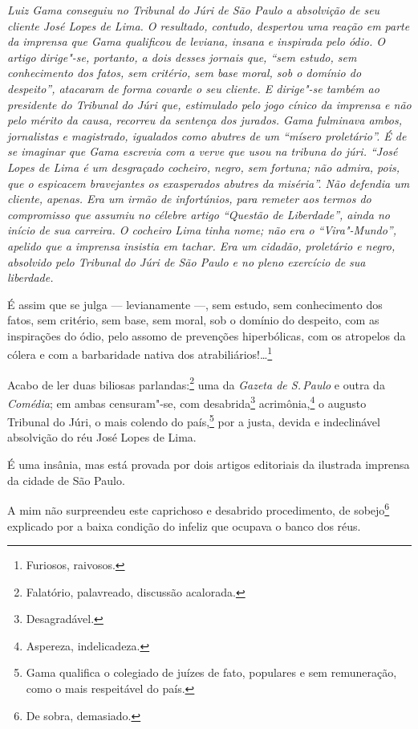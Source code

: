 \begin{flushleft}
{\footnotesize\itshape
Luiz Gama conseguiu no Tribunal
do Júri de São Paulo a absolvição de seu cliente José Lopes de Lima. O
resultado, contudo, despertou uma reação em parte da imprensa que Gama
qualificou de leviana, insana e inspirada pelo ódio. O artigo dirige"-se,
portanto, a dois desses jornais que, ``sem estudo, sem conhecimento dos
fatos, sem critério, sem base moral, sob o domínio do despeito'',
atacaram de forma covarde o seu cliente. E dirige"-se também ao presidente do
Tribunal do Júri que, estimulado pelo jogo cínico da imprensa e não pelo
mérito da causa, recorreu da sentença dos jurados. Gama fulminava ambos,
jornalistas e magistrado, igualados como abutres de um ``mísero
proletário''. É de se imaginar que Gama escrevia com a verve que usou na
tribuna do júri. ``José Lopes de Lima é um desgraçado cocheiro, negro,
sem fortuna; não admira, pois, que o espicacem bravejantes os
exasperados abutres da miséria''. Não defendia um cliente, apenas. Era um
irmão de infortúnios, para remeter aos termos do compromisso que assumiu
no célebre artigo ``Questão de Liberdade'', ainda no início de sua
carreira. O cocheiro Lima tinha nome; não era o ``Vira"-Mundo'', apelido
que a imprensa insistia em tachar. Era um cidadão, proletário e negro,
absolvido pelo Tribunal do Júri de São Paulo e no pleno exercício de sua
liberdade. }
\end{flushleft}

\noindent{}É assim que se julga --- levianamente ---, sem estudo, sem
conhecimento dos fatos, sem critério, sem base, sem moral, sob o domínio
do despeito, com as inspirações do ódio, pelo assomo de prevenções
hiperbólicas, com os atropelos da cólera e com a barbaridade nativa dos
atrabiliários!\ldots{}\footnote{Furiosos, raivosos.}

Acabo de ler duas biliosas parlandas:\footnote{Falatório, palavreado,
  discussão acalorada.} uma da \textit{Gazeta de S.\,Paulo} e outra da
\textit{Comédia}; em ambas censuram"-se, com desabrida\footnote{
  Desagradável.} acrimônia,\footnote{Aspereza, indelicadeza.} o
augusto Tribunal do Júri, o mais colendo do país,\footnote{Gama
  qualifica o colegiado de juízes de fato, populares e sem remuneração,
  como o mais respeitável do país.} por a justa, devida e indeclinável
absolvição do réu José Lopes de Lima.

É uma insânia, mas está provada por dois artigos editoriais da ilustrada
imprensa da cidade de São Paulo.

A mim não surpreendeu este caprichoso e desabrido procedimento, de
sobejo\footnote{De sobra, demasiado.} explicado por a baixa condição
do infeliz que ocupava o banco dos réus.

